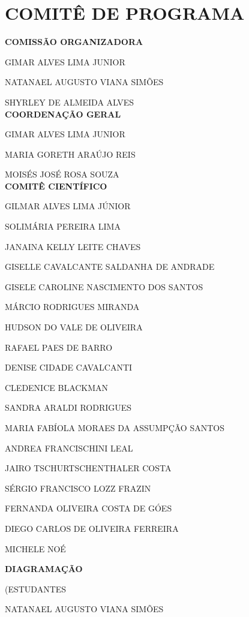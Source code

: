 \vspace*{0.6cm}
\section*{\centering \normalfont \LARGE COMITÊ DE PROGRAMA}
\vspace*{0.6cm}
\doublespace

\noindent \textbf{COMISSÃO ORGANIZADORA}

GIMAR ALVES LIMA JUNIOR

NATANAEL AUGUSTO VIANA SIMÕES

SHYRLEY DE ALMEIDA ALVES \\

\noindent \textbf{COORDENAÇÃO GERAL}

GIMAR ALVES LIMA JUNIOR

MARIA GORETH ARAÚJO REIS

MOISÉS JOSÉ ROSA SOUZA \\

\noindent \textbf{COMITÊ CIENTÍFICO}

GILMAR ALVES LIMA JÚNIOR

SOLIMÁRIA PEREIRA LIMA

JANAINA KELLY LEITE CHAVES

GISELLE CAVALCANTE SALDANHA DE ANDRADE

GISELE CAROLINE NASCIMENTO DOS SANTOS

MÁRCIO RODRIGUES MIRANDA

HUDSON DO VALE DE OLIVEIRA

RAFAEL PAES DE BARRO

DENISE CIDADE CAVALCANTI

CLEDENICE BLACKMAN

SANDRA ARALDI RODRIGUES

MARIA FABÍOLA MORAES DA ASSUMPÇÃO SANTOS

ANDREA FRANCISCHINI LEAL

JAIRO TSCHURTSCHENTHALER COSTA

SÉRGIO FRANCISCO LOZZ FRAZIN

FERNANDA OLIVEIRA COSTA DE GÓES

DIEGO CARLOS DE OLIVEIRA FERREIRA

MICHELE NOÉ

\noindent \textbf{DIAGRAMAÇÃO}

(ESTUDANTES

NATANAEL AUGUSTO VIANA SIMÕES

\singlespace
\newpage